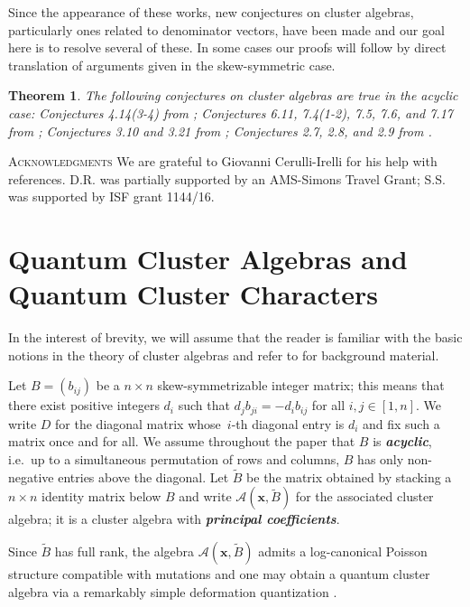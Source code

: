 \documentclass[12pt]{amsart}
\newtheorem{theorem}{Theorem}
\newcommand{\bfx}{\mathbf{x}}
\newcommand{\cA}{\mathcal{A}}
\newcommand{\newword}[1]{\textbf{\emph{#1}}}
\begin{document}
  Since the appearance of these works, new conjectures on cluster algebras, particularly ones related to denominator vectors, have been made and our goal here is to resolve several of these.
  In some cases our proofs will follow by direct translation of arguments given in the skew-symmetric case. 
  \begin{theorem}
    \label{thm:main}
    The following conjectures on cluster algebras are true in the acyclic case: Conjectures 4.14(3-4) from \cite{FZ03}; Conjectures 6.11, 7.4(1-2), 7.5, 7.6, and 7.17 from \cite{fomin-zelevinsky4}; Conjectures 3.10 and 3.21 from \cite{reading-speyer}; Conjectures 2.7, 2.8, and 2.9 from \cite{reading-stella}.
  \end{theorem}

\textsc{Acknowledgments}
  We are grateful to Giovanni Cerulli-Irelli for his help with references.
  D.R. was partially supported by an AMS-Simons Travel Grant; S.S. was supported by ISF grant 1144/16.

\section{Quantum Cluster Algebras and Quantum Cluster Characters}
\label{sec:qca}
  
  In the interest of brevity, we will assume that the reader is familiar with the basic notions in the theory of cluster algebras and refer to \cite{fomin-zelevinsky4} for background material.

  Let $B=(b_{ij})$ be a $n\times n$ skew-symmetrizable integer matrix; this means that there exist positive integers $d_i$ such that $d_jb_{ji}=-d_ib_{ij}$ for all $i,j\in[1,n]$. 
  We write $D$ for the diagonal matrix whose~$i$-th diagonal entry is $d_i$ and fix such a matrix once and for all.
  We assume throughout the paper that $B$ is \newword{acyclic}, i.e.\ up to a simultaneous permutation of rows and columns, $B$ has only non-negative entries above the diagonal.
  Let $\widetilde{B}$ be the matrix obtained by stacking a $n\times n$ identity matrix below $B$ and write $\cA(\bfx,\widetilde{B})$ for the associated cluster algebra; it is a cluster algebra with \newword{principal coefficients}.

  Since $\widetilde{B}$ has full rank, the algebra $\cA(\bfx,\widetilde{B})$ admits a log-canonical Poisson structure compatible with mutations \cite{gekhtman-shapiro-vainshtein} and one may obtain a quantum cluster algebra via a remarkably simple deformation quantization \cite{berenstein-zelevinsky}.  
\end{document}
